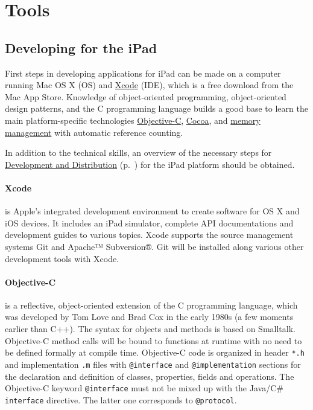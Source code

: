 
\section{Tools}

\subsection{Developing for the iPad}

First steps in developing applications for iPad can be made on a computer running Mac OS X (OS) and 
\href{sec:Xcode}{Xcode} (IDE), which is a free download from the Mac App Store.
Knowledge of object-oriented programming, object-oriented design patterns, 
and the C programming language 
builds a good base to learn the main platform-specific technologies 
\href{sec:ObjC}{Objective-C},
\href{sec:Cocoa}{Cocoa}, and
\href{sec:MemoryManagement}{memory management}
with automatic reference counting.

In addition to the technical skills, an overview of the necessary steps for 
\href{sec:DAD}{Development and Distribution} (p.~\pageref{sec:DAD}) for the iPad platform
should be obtained.

\paragraph{Xcode}
\label{sec:Xcode}
is Apple's integrated development environment to create software for OS X and iOS devices.
It includes an iPad simulator, complete API documentations and development guides to various topics. 
Xcode supports the source management systems Git and Apache™ Subversion®. 
Git will be installed along various other development tools with Xcode.

\paragraph{Objective-C}
\label{sec:ObjC}
is a reflective, object-oriented extension of the C programming language,
which was developed by Tom Love and Brad Cox in the early 1980s (a few moments earlier than C++). 
The syntax for objects and methods is based on Smalltalk. 
Objective-C method calls will be bound to functions at runtime with no need to be defined formally at compile time.
Objective-C code is organized in header \verb=*.h= and implementation \verb+.m+ files 
with \verb+@interface+ and \verb+@implementation+ sections for
the declaration and definition of classes, properties, fields and operations.
The Objective-C keyword \verb+@interface+ must not be mixed up with the Java/C\# \verb+interface+ directive. 
The latter one corresponds to \verb+@protocol+.

